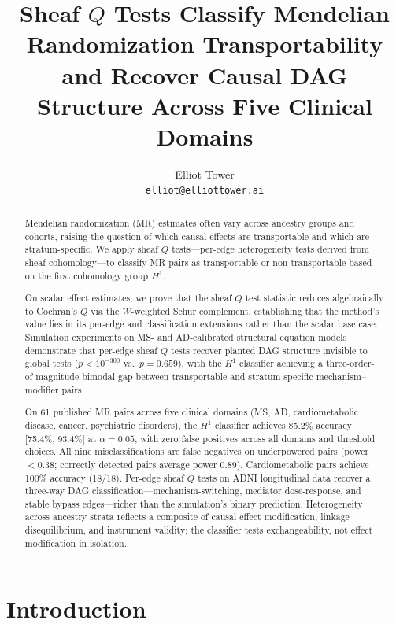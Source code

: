 \documentclass[11pt]{article}
\title{Sheaf $Q$ Tests Classify Mendelian Randomization Transportability and Recover Causal DAG Structure Across Five Clinical Domains}
\author{Elliot Tower\\
\texttt{elliot@elliottower.ai}}
\date{}
\begin{document}
\maketitle

\begin{abstract}
Mendelian randomization (MR) estimates often vary across ancestry groups and cohorts, raising the question of which causal effects are transportable and which are stratum-specific. We apply sheaf $Q$ tests---per-edge heterogeneity tests derived from sheaf cohomology---to classify MR pairs as transportable or non-transportable based on the first cohomology group $H^1$.

On scalar effect estimates, we prove that the sheaf $Q$ test statistic reduces algebraically to Cochran's $Q$ via the $W$-weighted Schur complement, establishing that the method's value lies in its per-edge and classification extensions rather than the scalar base case. Simulation experiments on MS- and AD-calibrated structural equation models demonstrate that per-edge sheaf $Q$ tests recover planted DAG structure invisible to global tests ($p < 10^{-300}$ vs.\ $p = 0.659$), with the $H^1$ classifier achieving a three-order-of-magnitude bimodal gap between transportable and stratum-specific mechanism--modifier pairs.

On 61 published MR pairs across five clinical domains (MS, AD, cardiometabolic disease, cancer, psychiatric disorders), the $H^1$ classifier achieves 85.2\% accuracy [75.4\%, 93.4\%] at $\alpha = 0.05$, with zero false positives across all domains and threshold choices. All nine misclassifications are false negatives on underpowered pairs (power $< 0.38$; correctly detected pairs average power $0.89$). Cardiometabolic pairs achieve 100\% accuracy (18/18). Per-edge sheaf $Q$ tests on ADNI longitudinal data recover a three-way DAG classification---mechanism-switching, mediator dose-response, and stable bypass edges---richer than the simulation's binary prediction. Heterogeneity across ancestry strata reflects a composite of causal effect modification, linkage disequilibrium, and instrument validity; the classifier tests exchangeability, not effect modification in isolation.
\end{abstract}

\section{Introduction}
\label{sec:intro}
\end{document}
